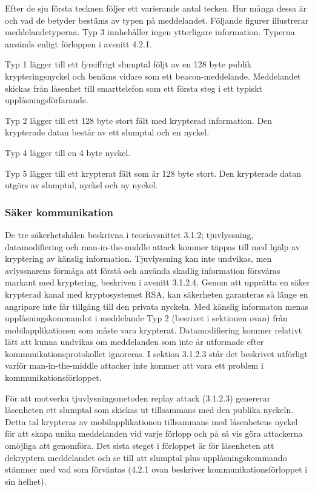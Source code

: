 \documentclass[11pt]{article}
\begin{document}

Efter de sju första tecknen följer ett varierande antal tecken. Hur många dessa är och vad de betyder bestäms av typen på meddelandet. Följande figurer illustrerar meddelandetyperna. Typ 3 innhehåller ingen ytterligare information. Typerna används enligt förloppen i avsnitt 4.2.1. 

Typ 1 lägger till ett fyrsiffrigt slumptal följt av en 128 byte publik krypteringsnyckel och benäms vidare som ett beacon-meddelande. Meddelandet skickas från låsenhet till smarttelefon som ett första steg i ett typiskt upplåsningsförfarande.


Typ 2 lägger till ett 128 byte stort fält med krypterad information. Den krypterade datan består av ett slumptal och en nyckel.


Typ 4 lägger till en 4 byte nyckel.


Typ 5 lägger till ett krypterat fält som är 128 byte stort. Den krypterade datan utgörs av slumptal, nyckel och ny nyckel.


\subsubsection{Säker kommunikation}
De tre säkerhetshålen beskrivna i teoriavsnittet 3.1.2; tjuvlyssning, datamodifiering och man-in-the-middle attack  kommer täppas till med hjälp av kryptering av känslig information. Tjuvlyssning kan inte undvikas, men avlyssnarens förmåga att förstå och använda skadlig information försvåras markant med kryptering, beskriven i avsnitt 3.1.2.4. Genom att upprätta en säker krypterad kanal med kryptosystemet RSA, kan säkerheten garanteras så länge en angripare inte får tillgång till den privata nyckeln. Med känslig informaton menas upplåsningskommandot i meddelande Typ 2 (besrivet i sektionen ovan) från mobilapplikationen som måste vara krypterat. Datamodifiering kommer relativt lätt att kunna undvikas om meddelanden som inte är utformade efter kommunikationsprotokollet ignoreras. I sektion 3.1.2.3 står det beskrivet utförligt varför man-in-the-middle attacker inte kommer att vara ett problem i kommunikationsförloppet. 

För att motverka tjuvlysningsmetoden replay attack (3.1.2.3) genererar låsenheten ett slumptal som skickas ut tillsammans med den publika nyckeln. Detta tal krypteras av mobilapplikationen tillsammans med låsenhetens nyckel för att skapa unika meddelanden vid varje förlopp och på så vis göra attackerna omöjliga att genomföra. Det sista steget i förloppet är för låsenheten att dekryptera meddelandet och se till att slumptal plus upplåsningskommando stämmer med vad som förväntas (4.2.1 ovan beskriver kommunikationsförloppet i sin helhet).
\end{document}
